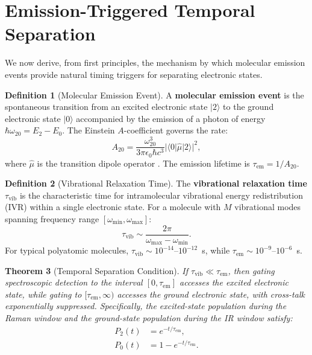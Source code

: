 \documentclass[11pt,a4paper]{article}
\newtheorem{theorem}{Theorem}[section]
\theoremstyle{definition}
\newtheorem{definition}[theorem]{Definition}
\theoremstyle{remark}
\begin{document}
\section{Emission-Triggered Temporal Separation}
\label{sec:emission}

We now derive, from first principles, the mechanism by which molecular emission events provide natural timing triggers for separating electronic states.

\begin{definition}[Molecular Emission Event]
\label{def:emission}
A \textbf{molecular emission event} is the spontaneous transition from an excited electronic state $|2\rangle$ to the ground electronic state $|0\rangle$ accompanied by the emission of a photon of energy $\hbar\omega_{20} = E_2 - E_0$. The Einstein $A$-coefficient governs the rate:
\begin{equation}
A_{20} = \frac{\omega_{20}^3}{3\pi \epsilon_0 \hbar c^3} |\langle 0 | \hat{\mu} | 2 \rangle|^2,
\end{equation}
where $\hat{\mu}$ is the transition dipole operator \citep{einstein1917, hilborn1982}. The emission lifetime is $\tau_{\mathrm{em}} = 1/A_{20}$.
\end{definition}

\begin{definition}[Vibrational Relaxation Time]
\label{def:tvib}
The \textbf{vibrational relaxation time} $\tau_{\mathrm{vib}}$ is the characteristic time for intramolecular vibrational energy redistribution (IVR) within a single electronic state. For a molecule with $M$ vibrational modes spanning frequency range $[\omega_{\min}, \omega_{\max}]$:
\begin{equation}
\tau_{\mathrm{vib}} \sim \frac{2\pi}{\omega_{\max} - \omega_{\min}}.
\end{equation}
For typical polyatomic molecules, $\tau_{\mathrm{vib}} \sim 10^{-14}$--$10^{-12}$~s, while $\tau_{\mathrm{em}} \sim 10^{-9}$--$10^{-6}$~s.
\end{definition}

\begin{theorem}[Temporal Separation Condition]
\label{thm:temporal_sep}
If $\tau_{\mathrm{vib}} \ll \tau_{\mathrm{em}}$, then gating spectroscopic detection to the interval $[0, \tau_{\mathrm{em}}]$ accesses the excited electronic state, while gating to $[\tau_{\mathrm{em}}, \infty)$ accesses the ground electronic state, with cross-talk exponentially suppressed. Specifically, the excited-state population during the Raman window and the ground-state population during the IR window satisfy:
\begin{align}
P_2(t) &= e^{-t/\tau_{\mathrm{em}}}, \label{eq:P2}\\
P_0(t) &= 1 - e^{-t/\tau_{\mathrm{em}}}. \label{eq:P0}
\end{align}
\end{theorem}
\end{document}
